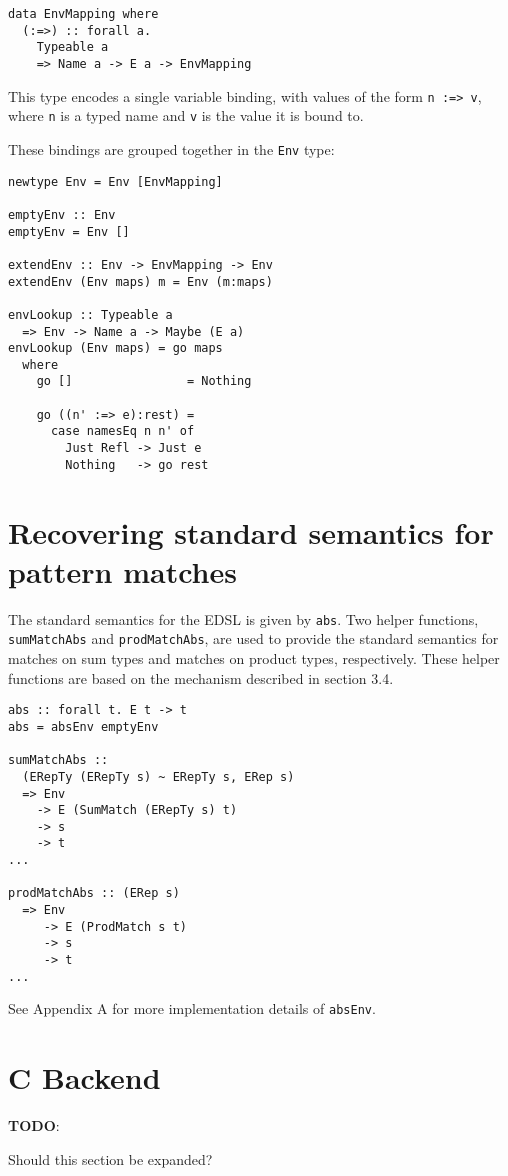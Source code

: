 \documentclass[sigplan,anonymous,review]{acmart}
\newcommand{\ttt}{\texttt}
\newenvironment{todo}
  {\begin{tcolorbox}
   \textbf{TODO}:
  }
  {\end{tcolorbox}
  }
\begin{document}
\begin{lstlisting}
data EnvMapping where
  (:=>) :: forall a.
    Typeable a
    => Name a -> E a -> EnvMapping
\end{lstlisting}

This type encodes a single variable binding, with values of the form
\ttt{n :=> v}, where \ttt{n} is a typed name and \ttt{v} is the value it is bound to.

These bindings are grouped together in the \ttt{Env} type:

\begin{lstlisting}
newtype Env = Env [EnvMapping]

emptyEnv :: Env
emptyEnv = Env []

extendEnv :: Env -> EnvMapping -> Env
extendEnv (Env maps) m = Env (m:maps)

envLookup :: Typeable a
  => Env -> Name a -> Maybe (E a)
envLookup (Env maps) = go maps
  where
    go []                = Nothing

    go ((n' :=> e):rest) =
      case namesEq n n' of
        Just Refl -> Just e
        Nothing   -> go rest
\end{lstlisting}


\section{Recovering standard semantics for pattern matches}

The standard semantics for the EDSL is given by \ttt{abs}. Two helper
functions, \ttt{sumMatchAbs} and \ttt{prodMatchAbs}, are used to provide
the standard semantics for matches on sum types and matches on product
types, respectively. These helper functions are based on the mechanism
described in section 3.4.

\begin{lstlisting}
abs :: forall t. E t -> t
abs = absEnv emptyEnv

sumMatchAbs ::
  (ERepTy (ERepTy s) ~ ERepTy s, ERep s)
  => Env
    -> E (SumMatch (ERepTy s) t)
    -> s
    -> t
...

prodMatchAbs :: (ERep s)
  => Env
     -> E (ProdMatch s t)
     -> s
     -> t
...
\end{lstlisting}

See Appendix A for more implementation details of \ttt{absEnv}.


\section{C Backend}
\begin{todo}
  Should this section be expanded?
\end{todo}
\end{document}
